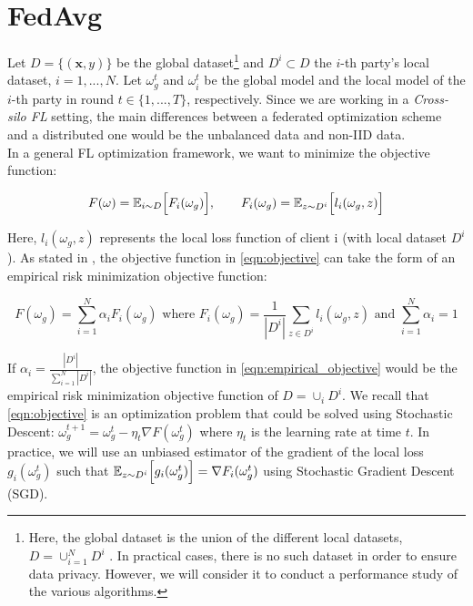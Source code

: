 \section{FedAvg}

Let $D = \{(\mathbf{x}, y)\}$ be the global dataset\footnote{Here, the global dataset is the union of the different local datasets, $D = \cup_{i=1}^N D^i$ . In practical cases, there is no such dataset in order to ensure data privacy. However, we will consider it to conduct a performance study of the various algorithms.} and $D^i \subset D$ the $i$-th party's local dataset, $i=1,...,N$.
Let $\omega_g^t$ and $\omega_i^t$ be the global model and the local model of the $i$-th party in round $t\in \{1,...,T\}$, respectively. Since we are working in a \textit{Cross-silo FL} setting, the main differences between a federated optimization scheme and a distributed one would be the unbalanced data and non-IID data.\\
In a general FL optimization framework, we want to minimize the objective function:

\begin{equation}
\label{eqn:objective}
F(\omega) = \mathbb{E}_{i \sim D}\Big[ F_i (\omega_g) \Big], \qquad F_i(\omega_g) = \mathbb{E}_{z \sim D^i}\Bigl[ l_i (\omega_g, z) \Bigr]
\end{equation}

Here, $l_i(\omega_g, z)$ represents the local loss function of client i (with local dataset $D^i$). As stated in \cite*{wang2021}, the objective function in \ref{eqn:objective}
can take the form of an empirical risk minimization objective function:

\begin{equation}
  \label{eqn:empirical_objective}
  F(\omega_g) = \sum_{i=1}^N \alpha_i F_i(\omega_g) \text{ where } F_i (\omega_g) = \frac{1}{|D^i|} \sum_{z \in D^i} l_i(\omega_g, z) \text{ and } \sum_{i=1}^N \alpha_i = 1
\end{equation}

If $\alpha_i = \frac{|D^i|}{\sum_{i=1}^N |D^i|}$, the objective function in \ref{eqn:empirical_objective} would be the empirical risk minimization objective function of $D = \cup_i D^i$. We recall that \ref{eqn:objective} is an optimization problem that could be solved using Stochastic Descent: $\omega_g^{t+1} = \omega_g^t - \eta_t \nabla F (\omega_g^t)$ where $\eta_t$ is the learning rate at time $t$. In practice, we will use an unbiased estimator of the gradient of the local loss $g_i (\omega_g^t)$ such that $\mathbb{E}_{z \sim D^i} \Bigl[ g_i (\omega_g^t) \Bigr] = \nabla F_i (\omega_g^t)$ using Stochastic Gradient Descent (SGD).


